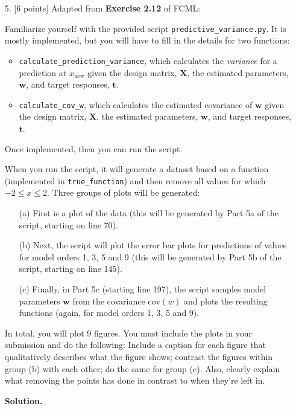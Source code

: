 \documentclass[10pt]{article}
\begin{document}
\begin{itemize}
\item[5.] [6 points]
Adapted from {\bf Exercise 2.12} of FCML:

Familiarize yourself with the provided script {\tt predictive\_variance.py}.  
It is mostly implemented, but you will have to fill in the details for two functions: 
\begin{itemize}
\item {\tt calculate\_prediction\_variance}, which calculates the {\em variance} for a prediction at $x_{\mathrm{new}}$ given the design matrix, $\mathbf{X}$, the estimated parameters, $\mathbf{w}$, and target responses, $\mathbf{t}$.
\item {\tt calculate\_cov\_w}, which calculates the estimated covariance of $\mathbf{w}$ given the design matrix, $\mathbf{X}$, the estimated parameters, $\mathbf{w}$, and target responses, $\mathbf{t}$.
\end{itemize}
Once implemented, then you can run the script.

When you run the script, it will generate a dataset based on a function (implemented in {\tt true\_function}) and then remove all values for which $-2 \leq x \leq 2$.  Three groups of plots will be generated:
\begin{enumerate}
\item[(a)] First is a plot of the data (this will be generated by Part 5a of the script, starting on line 70).  
\item[(b)] Next, the script will plot the error bar plots for predictions of values for model orders 1, 3, 5 and 9 (this will be generated by Part 5b of the script, starting on line 145).  
\item[(c)] Finally, in Part 5c (starting line 197), the script samples model parameters $\mathbf{w}$ from the covariance $\mathrm{cov}(w)$ and plots the resulting functions (again, for model orders 1, 3, 5 and 9).
\end{enumerate}

In total, you will plot 9 figures.  You must include the plots in your submission and do the following: Include a caption for each figure that qualitatively describes what the figure shows; contrast the figures within group (b) with each other; do the same for group (c).  Also, clearly explain what removing the points has done in contrast to when they're left in.

{\bf Solution.}


\end{itemize}
\end{document}
